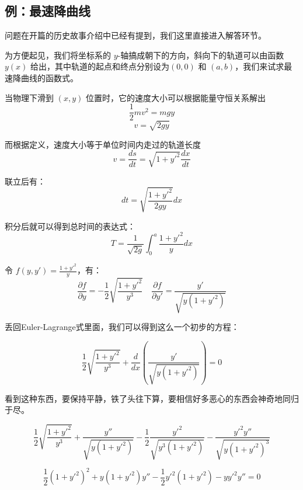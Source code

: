 \documentclass[12pt]{article}
\begin{document}
\subsection{例：最速降曲线}
问题在开篇的历史故事介绍中已经有提到，我们这里直接进入解答环节。

为方便起见，我们将坐标系的 $y$-轴搞成朝下的方向，斜向下的轨道可以由函数$y(x)$ 给出，其中轨道的起点和终点分别设为$(0,0)$ 和 $(a,b)$，我们来试求最速降曲线的函数式。

当物理下滑到 $(x,y)$ 位置时，它的速度大小可以根据能量守恒关系解出
$$
\frac{1}{2}mv^2 = mgy
$$
\begin{equation}
    v = \sqrt{2gy}
\end{equation}

而根据定义，速度大小等于单位时间内走过的轨道长度
\begin{equation}
    v = \frac{ds}{dt} = \sqrt{1+y'^2}\frac{dx}{dt}
\end{equation}

联立后有：
\begin{equation}
    dt = \sqrt{\frac{1+y'^2}{2gy}}dx
\end{equation}

积分后就可以得到总时间的表达式：
\begin{equation}
    T = \frac{1}{\sqrt{2g}}\int_0^a{\frac{1+y'^2}{y}dx}
\end{equation}

令 $f(y,y') = \frac{1+y'^2}{y}$，有：
$$
    \frac{\partial f}{\partial y} =  -\frac{1}{2}\sqrt{\frac{1+y'^2}{y^3}}  \quad \frac{\partial f}{\partial y'} = \frac{y'}{\sqrt{y(1+y'^2)}}
$$

丢回Euler-Lagrange式里面，我们可以得到这么一个初步的方程：

\begin{equation}
   \frac{1}{2}\sqrt{\frac{1+y'^2}{y^3}} + \frac{d}{dx}(\frac{y'}{\sqrt{y(1+y'^2)}}) = 0
\end{equation}

看到这种东西，要保持平静，铁了头往下算，要相信好多恶心的东西会神奇地同归于尽。

\begin{equation}
   \frac{1}{2}\sqrt{\frac{1+y'^2}{y^3}} + \frac{y''}{\sqrt{y(1+y'^2)}} - \frac{1}{2}\frac{y'^2}{\sqrt{y^3(1+y'^2)}} - \frac{y'^2y''}{\sqrt{y(1+y'^2)^3}}
\end{equation}

\begin{equation}
   \frac{1}{2}(1+y'^2)^2 + y(1+y'^2)y'' - \frac{1}{2}y'^2(1+y'^2) - yy'^2y'' = 0
\end{equation}
\end{document}
